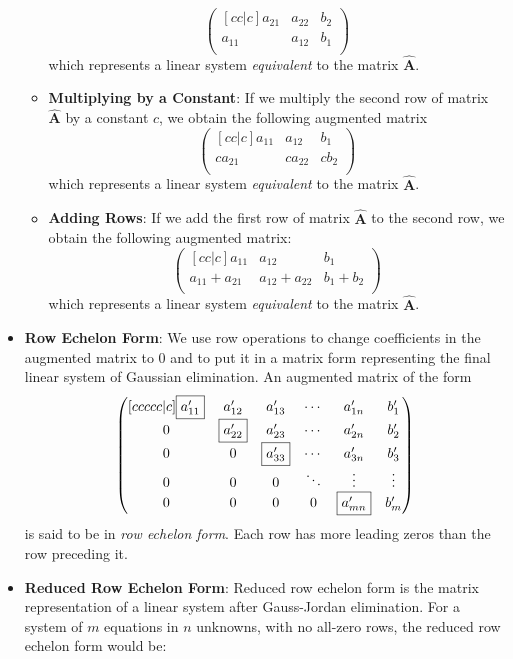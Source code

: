 \documentclass[11pt]{article}
\theoremstyle{definition}
\theoremstyle{remark}
\begin{document}
\begin{itemize}
\begin{itemize}
$$
\begin{pmatrix}[cc|c]
a_{21}&a_{22} & b_2 \\
a_{11}&a_{12} & b_1 \\
\end{pmatrix}
$$
which represents a linear system \textit{equivalent} to the matrix $\widehat{\mathbf{A}}$.
\item \textbf{Multiplying by a Constant}: If we multiply the second row of matrix $\widehat{\mathbf{A}}$ by a constant $c$, we obtain the following augmented matrix
$$
\begin{pmatrix}[cc|c]
a_{11}&a_{12} & b_1 \\
ca_{21}&ca_{22} & cb_2 \\
\end{pmatrix}
$$
which represents a linear system \textit{equivalent} to the matrix $\widehat{\mathbf{A}}$.
\item \textbf{Adding Rows}: If we add the first row of matrix $\widehat{\mathbf{A}}$ to the second row, we obtain the following augmented matrix:
$$
\begin{pmatrix}[cc|c]
a_{11}&a_{12} & b_1 \\
a_{11}+a_{21}&a_{12}+a_{22} & b_1 + b_2 \\
\end{pmatrix}
$$
which represents a linear system \textit{equivalent} to the matrix $\widehat{\mathbf{A}}$.
\end{itemize}
\item \textbf{Row Echelon Form}: We use row operations to change coefficients in the augmented matrix to 0 and to put it in a matrix form representing the final linear system of Gaussian elimination. An augmented matrix of the form
$$
\begin{pmatrix}[ccccc|c]
\fbox{$a'_{11}$}&a'_{12} & a'_{13} &\cdots & a'_{1n} & b'_1 \\
0 & \fbox{$a'_{22}$} & a'_{23} & \cdots & a'_{2n} & b'_2 \\
0 & 0 & \fbox{$a'_{33}$} & \cdots & a'_{3n} & b'_3 \\
0 & 0 & 0 & \ddots & \vdots & \vdots \\
0 & 0 & 0 & 0 & \fbox{$a'_{mn}$} & b'_m \\
\end{pmatrix}
$$
is said to be in \textit{row echelon form}. Each row has more leading zeros than the row preceding it.
\item \textbf{Reduced Row Echelon Form}: Reduced row echelon form is the matrix representation of a linear system after Gauss-Jordan elimination. For a system of $m$ equations in $n$ unknowns, with no all-zero rows, the reduced row echelon form would be: 

\end{itemize}
\end{document}
